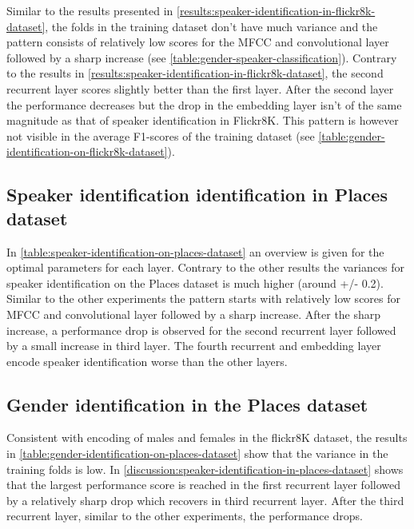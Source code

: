 \documentclass[a4paper, oneside]{book}
\begin{document}
Similar to the results presented in \autoref{results:speaker-identification-in-flickr8k-dataset}, the folds in the training dataset don’t have much variance and the pattern consists of relatively low scores for the MFCC and convolutional layer followed by a sharp increase (see \autoref{table:gender-speaker-classification}). Contrary to the results in \autoref{results:speaker-identification-in-flickr8k-dataset}, the second recurrent layer scores slightly better than the first layer. After the second layer the performance decreases but the drop in the embedding layer isn’t of the same magnitude as that of speaker identification in Flickr8K. This pattern is however not visible in the average F1-scores of the training dataset (see \autoref{table:gender-identification-on-flickr8k-dataset}).

\subsection{Speaker identification identification in Places dataset}\label{results:speaker-identification-in-places-dataset}

In \autoref{table:speaker-identification-on-places-dataset} an overview is given for the optimal parameters for each layer. Contrary to the other results the variances for speaker identification on the Places dataset is much higher (around +/- 0.2). Similar to the other experiments the pattern starts with relatively low scores for MFCC and convolutional layer followed by a sharp increase. After the sharp increase, a performance  drop is observed for the second recurrent layer followed by a small increase in third layer. The fourth recurrent and embedding layer encode speaker identification worse than the other layers.

\subsection{Gender identification in the Places dataset}\label{results:gender-identification-in-places-dataset}

Consistent with encoding of males and females in the flickr8K dataset, the results in \autoref{table:gender-identification-on-places-dataset} show that the variance in the training folds is low. In \autoref{discussion:speaker-identification-in-places-dataset} shows that the largest performance score is reached in the first recurrent layer followed by a relatively sharp drop which recovers in third recurrent layer. After the third recurrent layer, similar to the other experiments, the performance drops.
\end{document}
